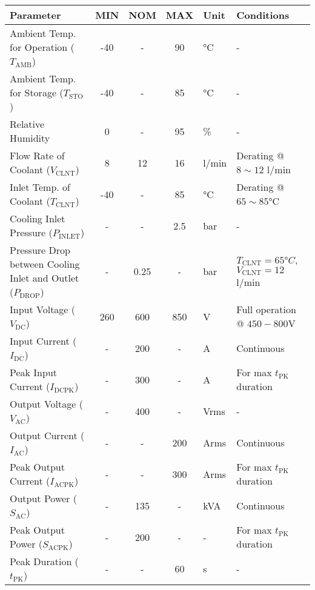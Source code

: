 \begin{table}[H]
    \centering
    \begin{tabular}{|l|c|c|c|l|l|}
        \hline
        \textbf{Parameter} & \textbf{MIN} & \textbf{NOM} & \textbf{MAX} & \textbf{Unit} & \textbf{Conditions} \\
        \hline
        Ambient Temp. for Operation ($T_{\text{AMB}}$) & -40 & - & 90 & °C & - \\
        \hline
        Ambient Temp. for Storage ($T_{\text{STO}}$) & -40 & - & 85 & °C & - \\
        \hline
        Relative Humidity & 0 & - & 95 & \% & - \\
        \hline
        Flow Rate of Coolant ($V_{\text{CLNT}}$) & 8 & 12 & 16 & l/min & Derating @ $8\sim12$ l/min \\
        \hline
        Inlet Temp. of Coolant ($T_{\text{CLNT}}$) & -40 & - & 85 & °C & Derating @ $65\sim85$°C \\
        \hline
        Cooling Inlet Pressure ($P_{\text{INLET}}$) & - & - & 2.5 & bar & - \\
        \hline
        Pressure Drop between Cooling Inlet and Outlet ($P_{\text{DROP}}$) & - & 0.25 & - & bar & $T_{\text{CLNT}}=65°C$, $V_{\text{CLNT}}=12$ l/min \\
        \hline
        Input Voltage ($V_{\text{DC}}$) & 260 & 600 & 850 & V & Full operation @ $450-800$V \\
        \hline
        Input Current ($I_{\text{DC}}$) & - & 200 & - & A & Continuous \\
        \hline
        Peak Input Current ($I_{\text{DCPK}}$) & - & 300 & - & A & For max $t_{\text{PK}}$ duration \\
        \hline
        Output Voltage ($V_{\text{AC}}$) & - & 400 & - & Vrms & - \\
        \hline
        Output Current ($I_{\text{AC}}$) & - & - & 200 & Arms & Continuous \\
        \hline
        Peak Output Current ($I_{\text{ACPK}}$) & - & - & 300 & Arms & For max $t_{\text{PK}}$ duration \\
        \hline
        Output Power ($S_{\text{AC}}$) & - & 135 & - & kVA & Continuous \\
        \hline
        Peak Output Power ($S_{\text{ACPK}}$) & - & 200 & - & - & For max $t_{\text{PK}}$ duration \\
        \hline
        Peak Duration ($t_{\text{PK}}$) & - & - & 60 & s & - \\

\end{tabular}
\end{table}
